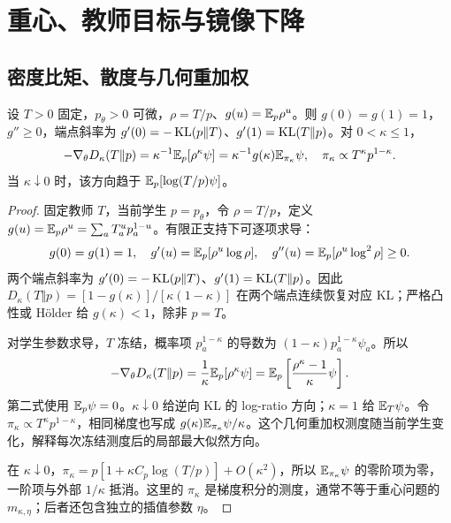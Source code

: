 \chapter{重心、教师目标与镜像下降}
\label{app:objective}
\section{密度比矩、散度与几何重加权}
\begin{proposition}[密度比矩与幂散度梯度]
设 $T>0$ 固定，$p_\theta>0$ 可微，$\rho=T/p$、$g(u)=\mathbb E_p\rho^u$。则 $g(0)=g(1)=1$，$g''\ge0$，端点斜率为 $g'(0)=-\operatorname{KL}(p\Vert T)$、$g'(1)=\operatorname{KL}(T\Vert p)$。对 $0<\kappa\le1$，
\begin{equation}
-\nabla_\theta D_\kappa(T\Vert p)
=\kappa^{-1}\mathbb E_p[\rho^\kappa\psi]
=\kappa^{-1}g(\kappa)\mathbb E_{\pi_\kappa}\psi,\quad
\pi_\kappa\propto T^\kappa p^{1-\kappa}.
\end{equation}
当 $\kappa\downarrow0$ 时，该方向趋于 $\mathbb E_p[\log(T/p)\psi]$。
\end{proposition}
\begin{proof}
固定教师 $T$，当前学生 $p=p_\theta$，令 $\rho=T/p$，定义 $g(u)=\mathbb E_p\rho^u=\sum_aT_a^up_a^{1-u}$。有限正支持下可逐项求导：
\begin{equation}
g(0)=g(1)=1,\quad g'(u)=\mathbb E_p[\rho^u\log\rho],\quad
g''(u)=\mathbb E_p[\rho^u\log^2\rho]\ge0.
\end{equation}
两个端点斜率为 $g'(0)=-\operatorname{KL}(p\Vert T)$、$g'(1)=\operatorname{KL}(T\Vert p)$。因此 $D_\kappa(T\Vert p)=[1-g(\kappa)]/[\kappa(1-\kappa)]$ 在两个端点连续恢复对应 KL；严格凸性或 Hölder 给 $g(\kappa)<1$，除非 $p=T$。

对学生参数求导，$T$ 冻结，概率项 $p_a^{1-\kappa}$ 的导数为 $(1-\kappa)p_a^{1-\kappa}\psi_a$。所以
\begin{equation}
-\nabla_\theta D_\kappa(T\Vert p)
=\frac1\kappa\mathbb E_p[\rho^\kappa\psi]
=\mathbb E_p\left[\frac{\rho^\kappa-1}{\kappa}\psi\right].
\end{equation}
第二式使用 $\mathbb E_p\psi=0$。$\kappa\downarrow0$ 给逆向 KL 的 log-ratio 方向；$\kappa=1$ 给 $\mathbb E_T\psi$。令 $\pi_\kappa\propto T^\kappa p^{1-\kappa}$，相同梯度也写成 $g(\kappa)\mathbb E_{\pi_\kappa}\psi/\kappa$。这个几何重加权测度随当前学生变化，解释每次冻结测度后的局部最大似然方向。

在 $\kappa\downarrow0$，$\pi_\kappa=p[1+\kappa C_p\log(T/p)]+O(\kappa^2)$，所以 $\mathbb E_{\pi_\kappa}\psi$ 的零阶项为零，一阶项与外部 $1/\kappa$ 抵消。这里的 $\pi_\kappa$ 是梯度积分的测度，通常不等于重心问题的 $m_{\kappa,\eta}$；后者还包含独立的插值参数 $\eta$。
\end{proof}

